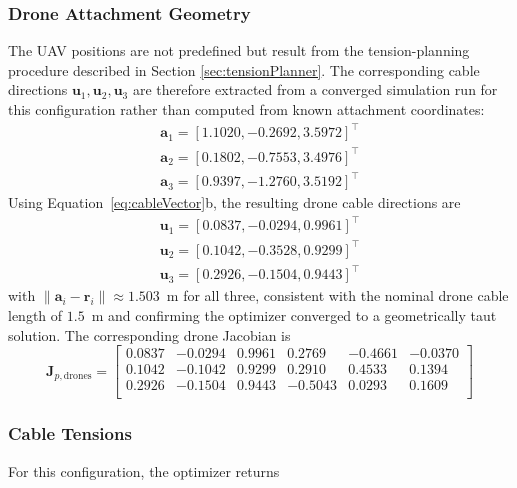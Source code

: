 \subsubsection{Drone Attachment Geometry}
The UAV positions are not predefined but result from the tension-planning procedure described in Section \ref{sec:tensionPlanner}. The corresponding cable directions $\mathbf u_1, \mathbf u_2, \mathbf u_3$ are therefore extracted from a converged simulation run for this configuration rather than computed from known attachment coordinates:
\begin{equation}
    \begin{aligned}
\mathbf a_1 = [1.1020, -0.2692, 3.5972]^\top \\
\mathbf a_2 = [0.1802, -0.7553, 3.4976]^\top \\
\mathbf a_3 = [0.9397, -1.2760, 3.5192]^\top
    \end{aligned}
\end{equation}
Using Equation~\eqref{eq:cableVector}b, the resulting drone cable directions are
\begin{equation}
    \begin{aligned}
\mathbf u_1 = [0.0837, -0.0294, 0.9961]^\top \\
\mathbf u_2 = [0.1042, -0.3528, 0.9299]^\top \\
\mathbf u_3 = [0.2926, -0.1504, 0.9443]^\top
    \end{aligned}
\end{equation}
with $\lVert \mathbf a_i - \mathbf r_i \rVert \approx 1.503$~m for all three, consistent with the nominal drone
cable length of $1.5$~m and confirming the optimizer converged to a geometrically taut solution.
The corresponding drone Jacobian is
\begin{equation}
\mathbf J_{p,\text{drones}} =
\begin{bmatrix}
0.0837 & -0.0294 & 0.9961 & 0.2769 & -0.4661  & -0.0370\\
0.1042 & -0.1042 & 0.9299 & 0.2910 & 0.4533 & 0.1394 \\
0.2926 & -0.1504 & 0.9443 &  -0.5043 & 0.0293 & 0.1609\\
\end{bmatrix}
\end{equation}

\subsubsection{Cable Tensions}
For this configuration, the optimizer returns

